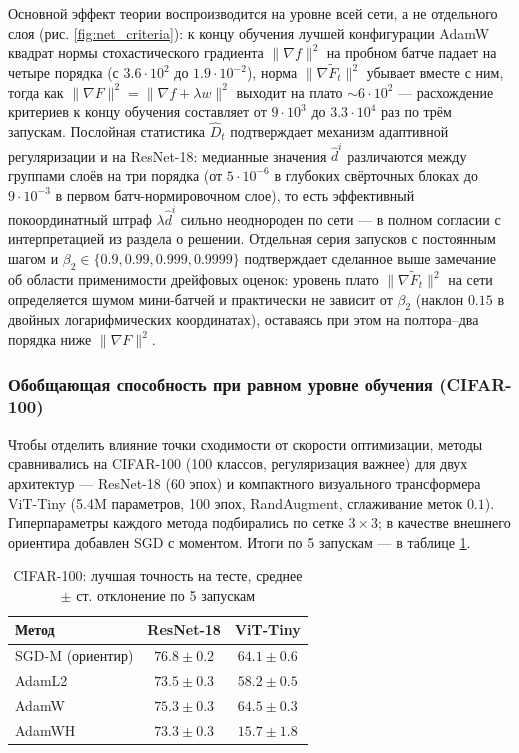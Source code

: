 Основной эффект теории воспроизводится на уровне всей сети, а не отдельного слоя (рис. \ref{fig:net_criteria}): к концу обучения лучшей конфигурации AdamW квадрат нормы стохастического градиента $\|\nabla f\|^2$ на пробном батче падает на четыре порядка (с $3.6\cdot10^2$ до $1.9\cdot10^{-2}$), норма $\|\nabla \widetilde{F}_t\|^2$ убывает вместе с ним, тогда как $\|\nabla F\|^2 = \|\nabla f + \lambda w\|^2$ выходит на плато $\sim 6\cdot10^2$ --- расхождение критериев к концу обучения составляет от $9\cdot10^3$ до $3.3\cdot10^4$ раз по трём запускам. Послойная статистика $\hat D_t$ подтверждает механизм адаптивной регуляризации и на ResNet-18: медианные значения $\hat d^i$ различаются между группами слоёв на три порядка (от $5\cdot10^{-6}$ в глубоких свёрточных блоках до $9\cdot10^{-3}$ в первом батч-нормировочном слое), то есть эффективный покоординатный штраф $\lambda \hat d^i$ сильно неоднороден по сети --- в полном согласии с интерпретацией из раздела о решении. Отдельная серия запусков с постоянным шагом и $\beta_2 \in \{0.9, 0.99, 0.999, 0.9999\}$ подтверждает сделанное выше замечание об области применимости дрейфовых оценок: уровень плато $\|\nabla \widetilde{F}_t\|^2$ на сети определяется шумом мини-батчей и практически не зависит от $\beta_2$ (наклон $0.15$ в двойных логарифмических координатах), оставаясь при этом на полтора--два порядка ниже $\|\nabla F\|^2$.

\subsubsection{Обобщающая способность при равном уровне обучения (CIFAR-100)}

Чтобы отделить влияние точки сходимости от скорости оптимизации, методы сравнивались на CIFAR-100 (100 классов, регуляризация важнее) для двух архитектур --- ResNet-18 (60 эпох) и компактного визуального трансформера ViT-Tiny (5.4M параметров, 100 эпох, RandAugment, сглаживание меток $0.1$). Гиперпараметры каждого метода подбирались по сетке $3{\times}3$; в качестве внешнего ориентира добавлен SGD с моментом. Итоги по 5 запускам --- в таблице \ref{tab:b4}.

\begin{table}[h!]
\centering
\caption{CIFAR-100: лучшая точность на тесте, среднее $\pm$ ст. отклонение по 5 запускам}
\label{tab:b4}
\begin{tabular}{lcc}
\toprule
Метод & ResNet-18 & ViT-Tiny \\
\midrule
SGD-M (ориентир) & $\mathbf{76.8 \pm 0.2}$ & $64.1 \pm 0.6$ \\
AdamL2 & $73.5 \pm 0.3$ & $58.2 \pm 0.5$ \\
AdamW & $75.3 \pm 0.3$ & $\mathbf{64.5 \pm 0.3}$ \\
AdamWH & $73.3 \pm 0.3$ & $15.7 \pm 1.8$ \\
\bottomrule
\end{tabular}
\end{table}

